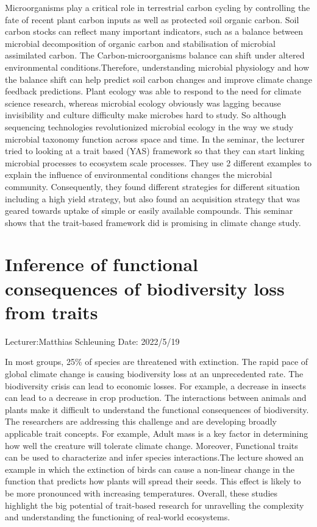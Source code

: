 \documentclass[11pt]{article}
\begin{document}
Microorganisms play a critical role in terrestrial carbon cycling by controlling the fate of recent plant carbon inputs as well as protected soil organic carbon. Soil carbon stocks can reflect many important indicators, such as a balance between microbial decomposition of organic carbon and stabilisation of microbial assimilated carbon. The Carbon-microorganisms balance can shift under altered environmental conditions.Therefore, understanding microbial physiology and how the balance shift can help predict soil carbon changes and improve climate change feedback predictions. Plant ecology was able to respond to the need for climate science research, whereas microbial ecology obviously was lagging because invisibility and culture difficulty make microbes hard to study. So although sequencing technologies revolutionized microbial ecology in the way we study microbial taxonomy function across space and time. In the seminar, the lecturer tried to looking at a trait based (YAS) framework so that they can start linking microbial processes to ecosystem scale processes. They use 2 different examples to explain the influence of environmental conditions changes the microbial community. Consequently, they found different strategies for different situation including a high yield strategy, but also found an acquisition strategy that was geared towards uptake of simple or easily available compounds. This seminar shows that the trait-based framework did is promising in climate change study.



\newpage

\section{Inference of functional consequences of biodiversity loss from traits}
Lecturer:Matthias Schleuning
\newline
Date: 2022/5/19
\newline

In most groups, 25\% of species are threatened with extinction. The rapid pace of global climate change is causing biodiversity loss at an unprecedented rate. The biodiversity crisis can lead to economic losses. For example, a decrease in insects can lead to a decrease in crop production. The interactions between animals and plants make it difficult to understand the functional consequences of biodiversity. The researchers are addressing this challenge and are developing broadly applicable trait concepts. For example, Adult mass is a key factor in determining how well the creature will tolerate climate change. Moreover, Functional traits can be used to characterize and infer species interactions.The lecture showed an example in which the extinction of birds can cause a non-linear change in the function that predicts how plants will spread their seeds. This effect is likely to be more pronounced with increasing temperatures. Overall, these studies highlight the big potential of trait-based research for unravelling the complexity and understanding the functioning of real-world ecosystems.
\newpage
\end{document}
